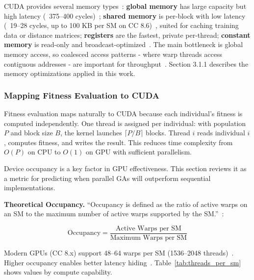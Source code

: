 CUDA provides several memory types~\cite{nvidia2024programming}: \textbf{global memory} has large capacity but high latency (~375--400 cycles)~\cite{jia2018volta}; \textbf{shared memory} is per-block with low latency (~19--28 cycles, up to 100 KB per SM on CC 8.6)~\cite{jia2018volta,nvidia2024programming}, suited for caching training data or distance matrices; \textbf{registers} are the fastest, private per-thread; \textbf{constant memory} is read-only and broadcast-optimized~\cite{nvidia2024programming}. The main bottleneck is global memory access, so coalesced access patterns - where warp threads access contiguous addresses - are important for throughput~\cite{nvidia2024cuda}. Section 3.1.1 describes the memory optimizations applied in this work.

\subsubsection*{Mapping Fitness Evaluation to CUDA}

Fitness evaluation maps naturally to CUDA because each individual's fitness is computed independently. One thread is assigned per individual: with population $P$ and block size $B$, the kernel launches $\lceil P/B \rceil$ blocks. Thread $i$ reads individual $i$, computes fitness, and writes the result. This reduces time complexity from $O(P)$ on CPU to $O(1)$ on GPU with sufficient parallelism.




Device occupancy is a key factor in GPU effectiveness. This section reviews it as a metric for predicting when parallel GAs will outperform sequential implementations.

\textbf{Theoretical Occupancy.} ``Occupancy is defined as the ratio of active warps on an SM to the maximum number of active warps supported by the SM.''~\cite{nvidia2024occupancy}:

\begin{equation}
\text{Occupancy} = \frac{\text{Active Warps per SM}}{\text{Maximum Warps per SM}}
\label{eq:occupancy}
\end{equation}

Modern GPUs (CC 8.x) support 48--64 warps per SM (1536--2048 threads)~\cite{jia2018volta}. Higher occupancy enables better latency hiding~\cite{volkov2010occupancy}. Table~\ref{tab:threads_per_sm} shows values by compute capability.

